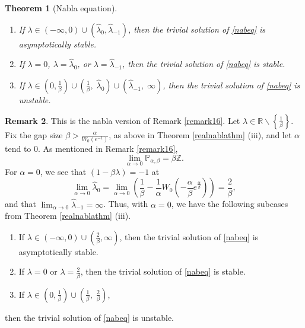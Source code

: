 \documentclass[12pt,reqno]{amsart}
\theoremstyle{plain}
\newtheorem{theorem}{Theorem}
\theoremstyle{definition}
\newtheorem{remark}[theorem]{Remark}
\newcommand{\R}{\ensuremath{\mathbb{R}}}
\newcommand{\Z}{\ensuremath{\mathbb{Z}}}
\newcommand{\p}{\ensuremath{\mathbb{P}}}
\numberwithin{equation}{section}
\numberwithin{theorem}{section}
\begin{document}
\begin{theorem}[Nabla equation]
\begin{enumerate}
\begin{enumerate}
\item If $\lambda\in(-\infty,0)\cup\left(\widehat{\lambda}_{0},\widehat{\lambda}_{-1}\right)$, then the trivial solution of \eqref{nabeq} is asymptotically stable. 
\item If $\lambda=0$, $\lambda=\widehat{\lambda}_{0}$, or $\lambda=\widehat{\lambda}_{-1}$, then the trivial solution of \eqref{nabeq} is stable.
\item If $\lambda\in\left(0,\frac{1}{\beta}\right)\cup\left(\frac{1}{\beta},\; \widehat{\lambda}_{0}\right)\cup\left(\widehat{\lambda}_{-1},\; \infty\right)$, 
then the trivial solution of \eqref{nabeq} is unstable.
\end{enumerate}
\end{enumerate}
\end{theorem}


\begin{remark}\label{remark26}
This is the nabla version of Remark \ref{remark16}. Let $\lambda\in\R\backslash\left\{\frac{1}{\beta}\right\}$. Fix the gap size $\beta>\frac{\alpha}{W_0(e^{-1})}$, as above in Theorem \ref{realnablathm} (iii), and let 
$\alpha$ tend to 0. As mentioned in Remark \ref{remark16}, 
$$ \lim_{\alpha\rightarrow 0}\p_{\alpha,\beta} = \beta\Z. $$
For $\alpha=0$, we see that $(1-\beta\lambda)=-1$ at 
$$ \lim_{\alpha\rightarrow 0}\widehat{\lambda}_{0}=\lim_{\alpha\rightarrow 0}\left(\frac{1}{\beta}-\frac{1}{\alpha}W_{0}\left(-\frac{\alpha}{\beta}e^{\frac{\alpha}{\beta}}\right)\right)=\frac{2}{\beta}, $$
and that $\displaystyle\lim_{\alpha\rightarrow 0}\widehat{\lambda}_{-1}=\infty$. Thus, with $\alpha=0$, we have the following subcases from 
Theorem \ref{realnablathm} (iii).
\begin{enumerate}	
\item[(a)]  If $\lambda\in(-\infty,0)\cup\left(\frac{2}{\beta},\infty\right)$, then the trivial solution of \eqref{nabeq} is asymptotically stable. 
\item[(b)] If $\lambda=0$ or $\lambda=\frac{2}{\beta}$, then the trivial solution of \eqref{nabeq} is stable.
\item[(c)] If $\lambda\in\left(0,\frac{1}{\beta}\right)\cup\left(\frac{1}{\beta},\; \frac{2}{\beta}\right)$, 
\end{enumerate}
then the trivial solution of \eqref{nabeq} is unstable.			
\end{remark}
\end{document}
